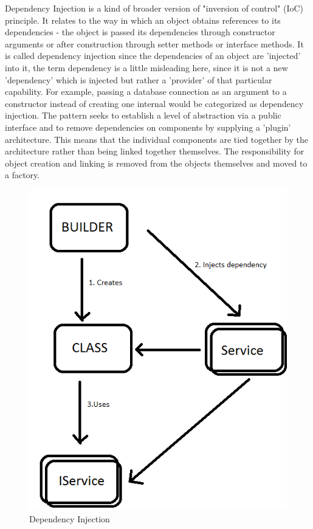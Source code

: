 \documentclass[a4paper,11pt,twoside]{report}
\theoremstyle{definition}
\begin{document}
Dependency Injection is a kind of broader version of "inversion of control" (IoC) principle. It relates to the way in which an object obtains references to its dependencies - the object is passed its dependencies through constructor arguments or after construction through setter methods or interface methods. It is called dependency injection since the dependencies of an object are 'injected' into it, the term dependency is a little misleading here, since it is not a new 'dependency' which is injected but rather a 'provider' of that particular capability. For example, passing a database connection as an argument to a constructor instead of creating one internal would be categorized as dependency injection.
The pattern seeks to establish a level of abstraction via a public interface and to remove dependencies on components by supplying a 'plugin' architecture. This means that the individual components are tied together by the architecture rather than being linked together themselves. The responsibility for object creation and linking is removed from the objects themselves and moved to a factory.


\begin{figure}[h!]

\begin{center}

\includegraphics[width=\textwidth]{dependency}

\end{center}
\caption{Dependency Injection}
\end{figure}
 
\end{document}
